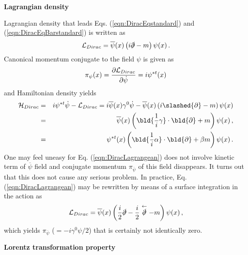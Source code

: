 \bigskip
\noindent
{\bf Lagrangian density}

Lagrangian density that leads Eqs. (\ref{eqn:DiracEqstandard}) and (\ref{eqn:DiracEqBarstandard})
is written as
\begin{eqnarray}
{\cal L}_{Dirac}
=
\overline{\psi}(x)
\left(i \slashed{\partial} - m \right)
\psi(x) \,.
\label{eqn:DiracLagrangean}
\end{eqnarray}
Canonical momentum conjugate to the field $\psi$ is given as
\begin{eqnarray}
\pi_{\psi}(x) = \frac{\partial {\cal L}_{Dirac}}{\partial \dot{\psi}}
=
i \psi^{*t} (x) 
\end{eqnarray}
and Hamiltonian density yields
\begin{eqnarray}
{\cal H}_{Dirac}
&=&
i \psi^{*t}  \dot {\psi} - {\cal L}_{Dirac}
= 
i \overline{\psi}(x) \gamma^0 \dot {\psi}
- 
\overline{\psi}(x)
\left(i \slashed{\partial} - m \right)
\psi(x)
\nonumber\\
&=&
\overline{\psi}(x)
\left(
 \bld{ \frac{1}{i}\gamma}\cdot\bld{\partial} + m 
 \right)
 \psi(x)\,,
 \\
 &=&
\psi^{*t}(x)
\left(
 \bld{ \frac{1}{i}\alpha}\cdot\bld{\partial} + \beta m 
 \right)
 \psi(x)\,.
\end{eqnarray}
One may feel uneasy for Eq. (\ref{eqn:DiracLagrangean})
does not involve kinetic term of $\overline{\psi}$ field and
conjugate momentum $\pi_{\overline{\psi}}$ of this field disappears. It turns out
that this does not cause any serious problem. In practice,
Eq. (\ref{eqn:DiracLagrangean}) may be rewritten by means
of a surface integration in the action as \cite{ref:Itzykson-Zuber}
\begin{eqnarray}
{\cal L}_{Dirac}
=
\overline{\psi}(x)
\left(
\frac{i}{2} \slashed{\partial}
- \frac{i}{2}  \stackrel{\leftarrow}{\slashed{\partial}}
 - m \right)
\psi(x) \,,
\label{eqn:DiracLagrangeanIZ}
\end{eqnarray}
which yields $\pi_{\overline{\psi}}$ ($= -i \gamma^0 \psi / 2$)
that is certainly not identically zero.

\bigskip
\noindent
{\bf Lorentz transformation property}

